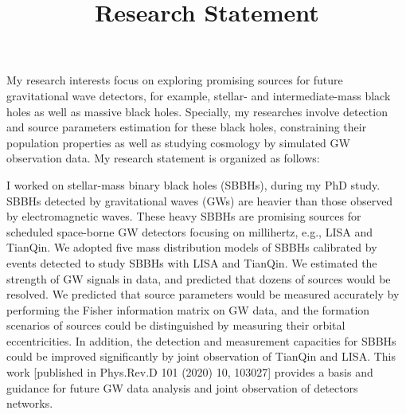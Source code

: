 \documentclass[12pt,a4paper,sans]{article}%
\title{\vspace{-2.5cm}\Huge Research Statement \vspace{-2.2em}}
\date{}
\begin{document}
\maketitle

My research interests focus on exploring promising sources for future gravitational wave detectors, for example, stellar- and
intermediate-mass black holes as well as massive black holes. Specially, my researches involve detection
and source parameters estimation for these black holes, constraining their population properties as well as studying
cosmology by simulated GW observation data. My research statement is organized as
follows:  

I worked on stellar-mass binary black holes (SBBHs), during my PhD study. SBBHs detected by
gravitational waves (GWs) are heavier than those observed by electromagnetic waves. These heavy SBBHs are promising sources for scheduled
space-borne GW detectors focusing on millihertz, e.g., LISA and TianQin. We adopted five mass
distribution models of SBBHs calibrated by events detected to study SBBHs with LISA and TianQin. We estimated the
strength of GW signals in data, and predicted that dozens of sources would be resolved. We predicted that source parameters
would be measured accurately by performing the Fisher information matrix on GW data, and the formation scenarios of sources
could be distinguished by measuring their orbital eccentricities. In addition, the detection and measurement capacities
for SBBHs could be improved significantly by joint
observation of TianQin and LISA. This work [published in Phys.Rev.D 101 (2020) 10, 103027] provides a basis and guidance for future GW
data analysis and joint observation of detectors networks. 
\end{document}
